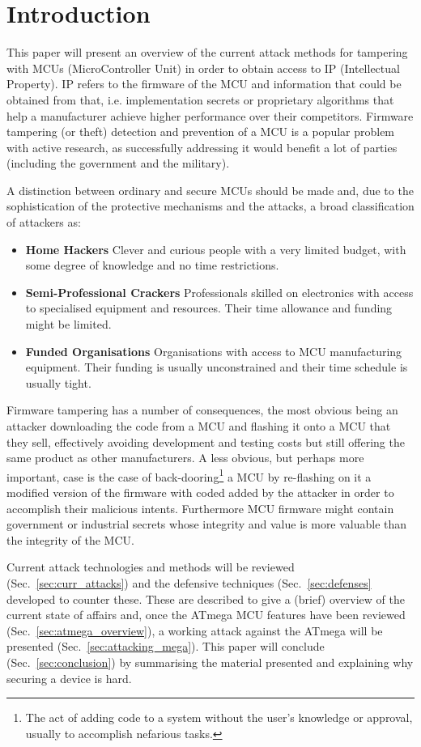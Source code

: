 \section{Introduction}
	This paper will present an overview of the current attack methods for tampering with MCUs (MicroController Unit) in order to obtain access to IP (Intellectual Property). IP refers to the firmware of the MCU and information that could be obtained from that, i.e. implementation secrets or proprietary algorithms that help a manufacturer achieve higher performance over their competitors. Firmware tampering (or theft) detection and prevention of a MCU is a popular problem with active research, as successfully addressing it would benefit a lot of parties (including the government and the military).
	
	A distinction between ordinary and secure MCUs should be made\citep{sergei:thesis} and, due to the sophistication of the protective mechanisms and the attacks, a broad classification of attackers as\cite{anderson:cautionary_note}:
		\begin{itemize}
			\item \textbf{Home Hackers} Clever and curious people with a very limited budget, with some degree of knowledge and no time restrictions.\\
			\item \textbf{Semi-Professional Crackers} Professionals skilled on electronics with access to specialised equipment and resources. Their time allowance and funding might be limited.\\
			\item \textbf{Funded Organisations} Organisations with access to MCU manufacturing equipment. Their funding is usually unconstrained and their time schedule is usually tight.
		\end{itemize}
	
	Firmware tampering has a number of consequences, the most obvious being an attacker downloading the code from a MCU and flashing it onto a MCU that they sell, effectively avoiding development and testing costs but still offering the same product as other manufacturers\cite{tech:aes_bls}. A less obvious, but perhaps more important, case is the case of back-dooring\footnote{The act of adding code to a system without the user's knowledge or approval, usually to accomplish nefarious tasks.} a MCU by re-flashing on it a modified version of the firmware with coded added by the attacker in order to accomplish their malicious intents. Furthermore MCU firmware might contain government or industrial secrets whose integrity and value is more valuable than the integrity of the MCU.
	
	Current attack technologies and methods will be reviewed (Sec.~\ref{sec:curr_attacks}) and the defensive techniques (Sec.~\ref{sec:defenses} developed to counter these. These are described to give a (brief) overview of the current state of affairs and, once the ATmega MCU features have been reviewed (Sec.~\ref{sec:atmega_overview}), a working attack against the ATmega will be presented (Sec.~\ref{sec:attacking_mega}). This paper will conclude (Sec.~\ref{sec:conclusion}) by summarising the material presented and explaining why securing a device is hard. 
